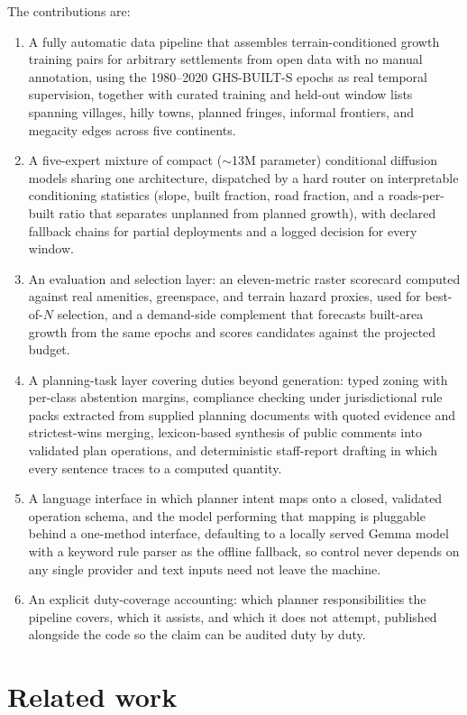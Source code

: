 \documentclass[11pt]{article}
\begin{document}
The contributions are:
\begin{enumerate}
\item A fully automatic data pipeline that assembles
terrain-conditioned growth training pairs for arbitrary settlements
from open data with no manual annotation, using the 1980--2020
GHS-BUILT-S epochs \citep{pesaresi2023ghsl} as real temporal
supervision, together with curated training and held-out window lists
spanning villages, hilly towns, planned fringes, informal frontiers,
and megacity edges across five continents.
\item A five-expert mixture of compact ($\sim$13M parameter)
conditional diffusion models sharing one architecture, dispatched by a
hard router on interpretable conditioning statistics (slope, built
fraction, road fraction, and a roads-per-built ratio that separates
unplanned from planned growth), with declared fallback chains for
partial deployments and a logged decision for every window.
\item An evaluation and selection layer: an eleven-metric raster
scorecard computed against real amenities, greenspace, and terrain
hazard proxies, used for best-of-$N$ selection, and a demand-side
complement that forecasts built-area growth from the same epochs and
scores candidates against the projected budget.
\item A planning-task layer covering duties beyond generation: typed
zoning with per-class abstention margins, compliance checking under
jurisdictional rule packs extracted from supplied planning documents
with quoted evidence and strictest-wins merging, lexicon-based
synthesis of public comments into validated
plan operations, and deterministic staff-report drafting in which every
sentence traces to a computed quantity.
\item A language interface in which planner intent maps onto a closed,
validated operation schema, and the model performing that mapping is
pluggable behind a one-method interface, defaulting to a locally
served Gemma model with a keyword rule parser as the offline fallback,
so control never depends on any single provider and text inputs need
not leave the machine.
\item An explicit duty-coverage accounting: which planner
responsibilities the pipeline covers, which it assists, and which it
does not attempt, published alongside the code so the claim can be
audited duty by duty.
\end{enumerate}

\section{Related work}
\end{document}
